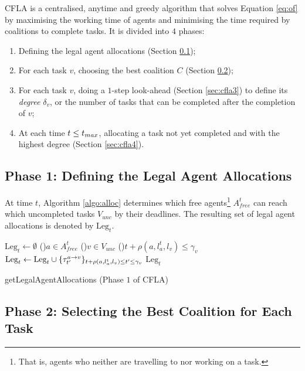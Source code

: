 CFLA is a centralised, anytime and greedy algorithm that solves Equation \ref{eq:of} by
maximising the working time of agents and minimising the time required by coalitions
to complete tasks. It is divided into $4$ phases:
\begin{enumerate}
    \item Defining the legal agent allocations (Section \ref{sec:cfla1});
    \item For each task $v$, choosing the best coalition $C$ (Section \ref{sec:cfla2});
    \item For each task $v$, doing a $1$-step look-ahead (Section \ref{sec:cfla3}) to
        define its \emph{degree} $\delta_v$, or the number of tasks that can be completed
        after the completion of $v$;
    \item At each time $t \leq t_{max}$, allocating a task not yet completed and with the
        highest degree (Section \ref{sec:cfla4}).
\end{enumerate}

\subsection{Phase 1: Defining the Legal Agent Allocations}\label{sec:cfla1}

At time $t$, Algorithm \ref{algo:alloc} determines which free agents\footnote{That is,
agents who neither are travelling to nor working on a task.} $A^t_{free}$ can reach
which uncompleted tasks $V_{unc}$ by their deadlines. The resulting set of legal
agent allocations is denoted by $\text{Leg}_t$.

\begin{algorithm}[t]
  \DontPrintSemicolon
  $\text{Leg}_t \gets \emptyset$ \;
  \For(){$a \in A^t_{free}$}{
      \For(){$v \in V_{unc}$}{
          \If(){$t +
              \rho(a, l_a^t, l_v) \leq \gamma_v$}{
              $\text{Leg}_t \gets \text{Leg}_t \cup \{ \tau^{a \rightarrow v}_{t'} \}_{t + \rho(a,
              l_a^t, l_v) \leq t' \leq \gamma_v}$\;
          }
      }
  }
  \Return $\text{Leg}_t$\;
  \caption{\textsf{getLegalAgentAllocations} (Phase $1$ of CFLA)\label{algo:alloc}}
\end{algorithm}

\subsection{Phase 2: Selecting the Best Coalition for Each Task}\label{sec:cfla2}

